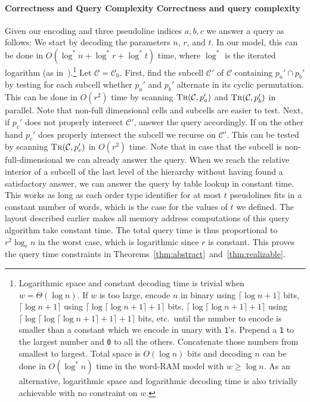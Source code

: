 \paragraph*{\iftitlecase%
Correctness and Query Complexity\else%
Correctness and query complexity\fi} Given our encoding and three
pseudoline indices \(a,b,c\) we answer a query as follows: We start by decoding the
parameters \(n\), \(r\), and \(t\). In our model, this can be done in
\(O(\log^* n + \log^* r + \log^* t)\) time, where \(\log^*\) is the iterated
logarithm (as in~\cite{Ma93}).\footnote{%
  Logarithmic space and constant decoding time is trivial when \(w =
  \Theta(\log n)\).
  If \(w\) is too large, encode \(n\) in binary using \(\lceil \log n + 1\rceil\)
  bits, \(\lceil \log n + 1\rceil\) using \(\lceil \log \lceil \log n + 1
  \rceil +1 \rceil\) bits,
  \(\lceil \log \lceil \log n + 1\rceil +1\rceil\) using \(\lceil \log \lceil
  \log \lceil \log n + 1\rceil +1\rceil +1\rceil\) bits,
  etc.\ until the number to encode is smaller than a constant which we encode
  in unary with \texttt{1}'s. Prepend a \texttt{1} to the largest number and
  \texttt{0} to all the others. Concatenate those numbers
  from smallest to largest. Total space is \(O(\log n)\) bits and decoding
  \(n\) can be done in \(O(\log^* n)\) time in the word-RAM model with \(w \geq
  \log n\).
  As an alternative, logarithmic space and logarithmic decoding time is also
  trivially achievable with no constraint on \(w\).%
}
Let \(\mathcal{C} = \mathcal{C}_{0}\).
First, find the subcell \(\mathcal{C}'\) of \(\mathcal{C}\) containing \(p_a'
\cap p_b'\) by testing for each subcell whether
\(p_a'\) and \(p_b'\) alternate in its cyclic permutation.
This can be done in \(O(r^2)\) time by scanning \(\textsc{Tr}(\mathcal{C},
p_a')\) and \(\textsc{Tr}(\mathcal{C}, p_b')\) in parallel. Note that non-full
dimensional cells and subcells are easier to test. Next, if \(p_c'\) does
not properly intersect \(\mathcal{C}'\), answer the query accordingly. If on
the other hand \(p_c'\) does properly intersect the subcell we recurse on
\(\mathcal{C}'\). This can be tested by scanning \(\textsc{Tr}(\mathcal{C},
p_c')\) in \(O(r^2)\) time. Note that in case that the subcell is
non-full-dimensional we can already answer the query. When we
reach the relative interior of a subcell of the last level of the hierarchy
without having found a satisfactory answer, we can answer the query by table
lookup in constant time. This works as long as each order type identifier for
at most \(t\) pseudolines fits in a constant number of words, which is the case
for the values of \(t\) we defined.
%
The layout described earlier makes all memory address computations of this
query algorithm take constant time.
%
The total query time is thus proportional
to \(r^2 \log_r n\) in the worst case, which is logarithmic since \(r\) is
constant.
%
This proves the query time constraints in
Theorems~\ref{thm:abstract}~and~\ref{thm:realizable}.

